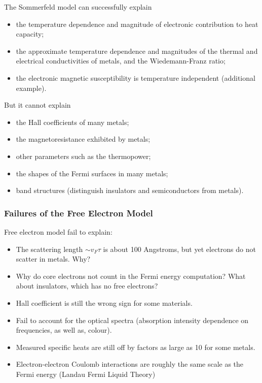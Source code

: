 \documentclass[a4paper]{article}
\begin{document}
\begin{Note}
The Sommerfeld model can successfully explain
\begin{itemize}
    \item the temperature dependence and magnitude of electronic contribution to heat capacity;
    \item the approximate temperature dependence and magnitudes of the thermal and electrical conductivities of metals, and the Wiedemann-Franz ratio;
    \item the electronic magnetic susceptibility is temperature independent (additional example).
\end{itemize}
But it cannot explain
\begin{itemize}
    \item the Hall coefficients of many metals;
    \item the magnetoresistance exhibited by metals;
    \item other parameters such as the thermopower;
    \item the shapes of the Fermi surfaces in many metals;
    \item band structures (distinguish insulators and semiconductors from metals).
\end{itemize}
\end{Note}
\subsubsection*{Failures of the Free Electron Model}
\begin{Note}
Free electron model fail to explain:
\begin{itemize}
    \item The scattering length $\sim v_F\tau$ is about 100 Angstroms, but yet electrons do not scatter in metals. Why?
    \item Why do core electrons not count in the Fermi energy computation? What about insulators, which has no free electrons?
    \item Hall coefficient is still the wrong sign for some materials.
    \item Fail to account for the optical spectra (absorption intensity dependence on frequencies, as well as, colour).
    \item Measured specific heats are still off by factors as large as 10 for some metals.
    \item Electron-electron Coulomb interactions are roughly the same scale as the Fermi energy (Landau Fermi Liquid Theory)
\end{itemize}
\end{Note}
\newpage
\end{document}
